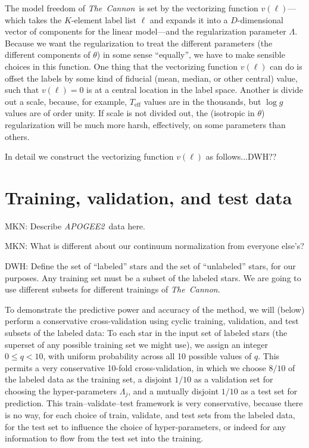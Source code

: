 \documentclass[12pt,preprint]{aastex}
\newcommand{\project}[1]{\textsl{#1}}
\newcommand{\TheCannon}{\project{The~Cannon}}
\newcommand{\acronym}[1]{{\small{#1}}}
\newcommand{\apogee}{\project{\acronym{APOGEE2}}}
\newcommand{\logg}{\log g}
\newcommand{\Teff}{T_{\mathrm{eff}}}
\begin{document}
The model freedom of \TheCannon\ is set by the vectorizing function
$v(\ell)$---which takes the $K$-element label list $\ell$ and expands
it into a $D$-dimensional vector of components for the linear
model---and the regularization parameter $\Lambda$.
Because we want the regularization to treat the different parameters
(the different components of $\theta$) in some sense ``equally'', we
have to make sensible choices in this function.
One thing that the vectorizing function $v(\ell)$ can do is offset the
labels by some kind of fiducial (mean, median, or other central)
value, such that $v(\ell)=0$ is at a central location in the label
space.
Another is divide out a scale, because, for example, $\Teff$ values
are in the thousands, but $\logg$ values are of order unity.
If scale is not divided out, the (isotropic in $\theta$)
regularization will be much more harsh, effectively, on some
parameters than others.

In detail we construct the vectorizing function $v(\ell)$ as follows...DWH??

\section{Training, validation, and test data}

MKN: Describe \apogee\ data here.

MKN: What is different about our continuum normalization from everyone else's?

DWH: Define the set of ``labeled'' stars and the set of ``unlabeled''
stars, for our purposes.  Any training set must be a subset of the
labeled stars.
We are going to use different subsets for different trainings of \TheCannon.

To demonstrate the predictive power and accuracy of the method, we
will (below) perform a conservative cross-validation using cyclic
training, validation, and test subsets of the labeled data:
To each star in the input set of labeled stars (the superset of any
possible training set we might use), we assign an integer $0\leq
q<10$, with uniform probability across all 10 possible values of $q$.
This permits a very conservative 10-fold cross-validation, in which we
choose $8/10$ of the labeled data as the training set, a disjoint
$1/10$ as a validation set for choosing the hyper-parameters
$\Lambda_j$, and a mutually disjoint $1/10$ as a test set for
prediction.
This train--validate--test framework is very conservative, because there
is no way, for each choice of train, validate, and test sets from the
labeled data, for the test set to influence the choice of
hyper-parameters, or indeed for any information to flow from the test
set into the training.
\end{document}
